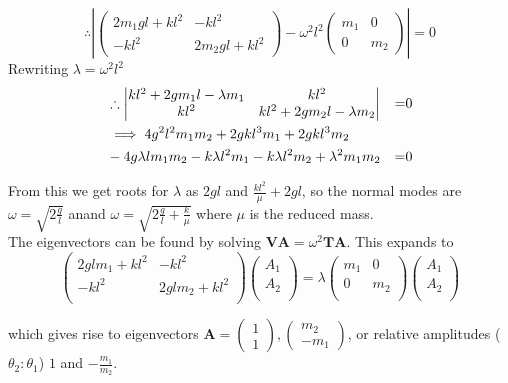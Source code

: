 \documentclass[12pt]{article}
\begin{document}
$$\therefore\left|\begin{pmatrix}
2m_1gl+kl^2 & -kl^2\\
-kl^2&  2m_2gl+kl^2
\end{pmatrix}-\omega^2l^2\begin{pmatrix}
m_1 &0\\0&m_2
\end{pmatrix}\right|=0$$
Rewriting $\lambda=\omega^2l^2$
\begin{align}
&\therefore \begin{vmatrix}k l^2+2 g m_1 l-\lambda  m_1 & k l^2 \\
 k l^2 & k l^2+2 g m_2 l-\lambda  m_2 \\
\end{vmatrix} &=& 0\notag\\ &\implies 4 g^2 l^2 m_1 m_2+2 g k l^3 m_1+2 g k l^3 m_2\notag\\ &-4 g \lambda  l m_1 m_2-k \lambda  l^2 m_1-k \lambda  l^2 m_2+\lambda ^2 m_1 m_2 &=& 0\notag 
\end{align}	

From this we get roots for $\lambda$ as $2gl$ and $\frac{kl^2}{\mu}+2gl$, so the normal modes are $\boxed{\omega=\sqrt{2\frac{g}{l}}}$ anand $\boxed{\omega=\sqrt{2\frac{g}{l}+\frac{k}{\mu}}}$ where $\mu$ is the reduced mass.\\

The eigenvectors can be found by solving $\mathbf{VA}=\omega^2\mathbf{TA}$. This expands to $$\begin{pmatrix}
 2 g l m_1+k l^2 & -k l^2 \\
 -k l^2 & 2 g l m_2+k l^2 \\
\end{pmatrix}
\begin{pmatrix}
 A_1 \\
 A_2 \\
\end{pmatrix}
=\lambda 
\begin{pmatrix}
 m_1 & 0 \\
 0 & m_2 \\
\end{pmatrix}
\begin{pmatrix}
 A_1 \\
 A_2 \\
\end{pmatrix}
$$

which gives rise to eigenvectors $\boxed{\mathbf A= \begin{pmatrix}1 \\ 1\end{pmatrix},\begin{pmatrix}m_2 \\ -m_1\end{pmatrix}}$, or relative amplitudes ($\theta_2:\theta_1$) $1$ and $-\frac{m_1}{m_2}$.
\end{document}
